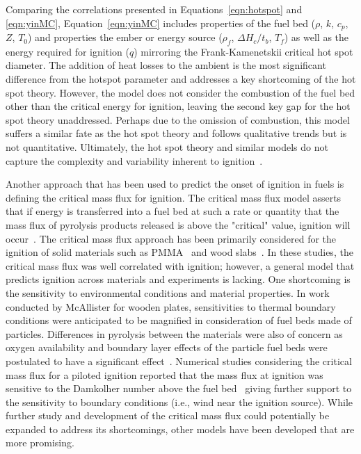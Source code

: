    Comparing the correlations presented in Equations~\ref{eqn:hotspot} and \ref{eqn:yinMC}, Equation~\ref{eqn:yinMC} includes properties of the fuel bed ($\rho$, $k$, $c_p$, $Z$, $T_0$) and properties the ember or energy source ($\rho_f$, $\Delta H_c/t_b$, $T_f$) as well as the energy required for ignition ($q$) mirroring the Frank-Kamenetskii critical hot spot diameter. The addition of heat losses to the ambient is the most significant difference from the hotspot parameter and addresses a key shortcoming of the hot spot theory. However, the model does not consider the combustion of the fuel bed other than the critical energy for ignition, leaving the second key gap for the hot spot theory unaddressed. Perhaps due to the omission of combustion, this model suffers a similar fate as the hot spot theory and follows qualitative trends but is not quantitative. Ultimately, the hot spot theory and similar models do not capture the complexity and variability inherent to ignition~\cite{Manzello2020}. 
    
    Another approach that has been used to predict the onset of ignition in fuels is defining the critical mass flux for ignition. The critical mass flux model asserts that if energy is transferred into a fuel bed at such a rate or quantity that the mass flux of pyrolysis products released is above the "critical" value, ignition will occur~\cite{Nelson1995}. The critical mass flux approach has been primarily considered for the ignition of solid materials such as PMMA~\cite{Rich2007} and wood slabs~\cite{Yashwanth2015, McAllister2013}. In these studies, the critical mass flux was well correlated with ignition; however, a general model that predicts ignition across materials and experiments is lacking. One shortcoming is the sensitivity to environmental conditions and material properties. In work conducted by McAllister for wooden plates, sensitivities to thermal boundary conditions were anticipated to be magnified in consideration of fuel beds made of particles. Differences in pyrolysis between the materials were also of concern as oxygen availability and boundary layer effects of the particle fuel beds were postulated to have a significant effect~\cite{McAllister2013}. Numerical studies considering the critical mass flux for a piloted ignition reported that the mass flux at ignition was sensitive to the Damkolher number above the fuel bed~\cite{Dai2013} giving further support to the sensitivity to boundary conditions (i.e., wind near the ignition source). While further study and development of the critical mass flux could potentially be expanded to address its shortcomings, other models have been developed that are more promising.
    
